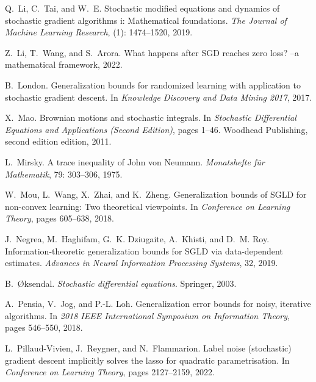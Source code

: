 \documentclass{article}
\begin{document}
\begin{thebibliography}{47}
Q.~Li, C.~Tai, and W.~E.
\newblock Stochastic modified equations and dynamics of stochastic gradient algorithms i: Mathematical foundations.
\newblock \emph{The Journal of Machine Learning Research},  (1): 1474--1520, 2019{}.

Z.~Li, T.~Wang, and S.~Arora.
\newblock What happens after {SGD} reaches zero loss? --a mathematical framework, 2022.

B.~London.
\newblock Generalization bounds for randomized learning with application to stochastic gradient descent.
\newblock In \emph{Knowledge Discovery and Data Mining 2017}, 2017.

X.~Mao.
\newblock Brownian motions and stochastic integrals.
\newblock In \emph{Stochastic Differential Equations and Applications (Second Edition)}, pages 1--46. Woodhead Publishing, second edition edition, 2011.

L.~Mirsky.
\newblock A trace inequality of {J}ohn von {N}eumann.
\newblock \emph{Monatshefte für Mathematik}, 79: 303--306, 1975.

W.~Mou, L.~Wang, X.~Zhai, and K.~Zheng.
\newblock Generalization bounds of {SGLD} for non-convex learning: Two theoretical viewpoints.
\newblock In \emph{Conference on Learning Theory}, pages 605--638, 2018.

J.~Negrea, M.~Haghifam, G.~K. Dziugaite, A.~Khisti, and D.~M. Roy.
\newblock Information-theoretic generalization bounds for {SGLD} via data-dependent estimates.
\newblock \emph{Advances in Neural Information Processing Systems}, 32, 2019.

B.~{\O}ksendal.
\newblock \emph{Stochastic differential equations}.
\newblock Springer, 2003.

A.~Pensia, V.~Jog, and P.-L. Loh.
\newblock Generalization error bounds for noisy, iterative algorithms.
\newblock In \emph{2018 IEEE International Symposium on Information Theory}, pages 546--550, 2018.

L.~Pillaud-Vivien, J.~Reygner, and N.~Flammarion.
\newblock Label noise (stochastic) gradient descent implicitly solves the lasso for quadratic parametrisation.
\newblock In \emph{Conference on Learning Theory}, pages 2127--2159, 2022.


\end{thebibliography}
\end{document}
